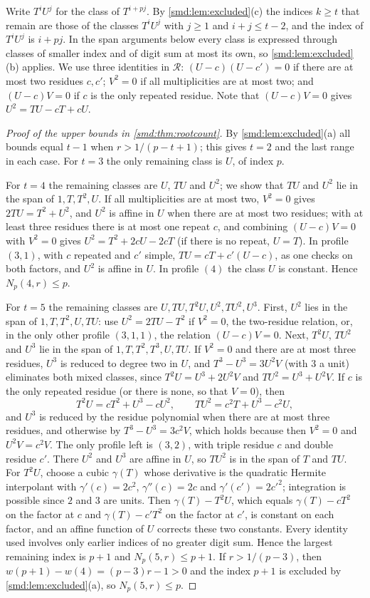 Write $T^iU^j$ for the class of $T^{i+pj}$. By \cref{smd:lem:excluded}(c) the indices $k\ge t$
that remain are those of the classes $T^iU^j$ with $j\ge1$ and $i+j\le t-2$, and the index of
$T^iU^j$ is $i+pj$. In the span arguments below every class is expressed through classes of
smaller index and of digit sum at most its own, so \cref{smd:lem:excluded}(b) applies. We use
three identities in $\mathcal R$: $(U-c)(U-c')=0$ if there are at most two residues $c,c'$;
$V^2=0$ if all multiplicities are at most two; and $(U-c)V=0$ if $c$ is the only repeated
residue. Note that $(U-c)V=0$ gives $U^2=TU-cT+cU$.

\begin{proof}[Proof of the upper bounds in \cref{smd:thm:rootcount}]
By \cref{smd:lem:excluded}(a) all bounds equal $t-1$ when $r>1/(p-t+1)$; this gives $t=2$
and the last range in each case. For $t=3$ the only remaining class is $U$, of index $p$.

For $t=4$ the remaining classes are $U$, $TU$ and $U^2$; we show that $TU$ and $U^2$ lie in
the span of $1,T,T^2,U$. If all multiplicities are at most two, $V^2=0$ gives
$2TU=T^2+U^2$, and $U^2$ is affine in $U$ when there are at most two residues; with at least
three residues there is at most one repeat $c$, and combining $(U-c)V=0$ with $V^2=0$ gives
$U^2=T^2+2cU-2cT$ (if there is no repeat, $U=T$). In profile $(3,1)$, with $c$ repeated and
$c'$ simple, $TU=cT+c'(U-c)$, as one checks on both factors, and $U^2$ is affine in $U$. In
profile $(4)$ the class $U$ is constant. Hence $N_p(4,r)\le p$.

For $t=5$ the remaining classes are $U,TU,T^2U,U^2,TU^2,U^3$. First, $U^2$ lies in the span
of $1,T,T^2,U,TU$: use $U^2=2TU-T^2$ if $V^2=0$, the two-residue relation, or, in the only
other profile $(3,1,1)$, the relation $(U-c)V=0$. Next, $T^2U$, $TU^2$ and $U^3$ lie in the
span of $1,T,T^2,T^3,U,TU$. If $V^2=0$ and there are at most three residues, $U^3$ is
reduced to degree two in $U$, and $T^3-U^3=3U^2V$ (with $3$ a unit) eliminates both mixed
classes, since $T^2U=U^3+2U^2V$ and $TU^2=U^3+U^2V$. If $c$ is the only repeated residue (or
there is none, so that $V=0$), then
\[
 T^2U=cT^2+U^3-cU^2,\qquad TU^2=c^2T+U^3-c^2U,
\]
and $U^3$ is reduced by the residue polynomial when there are at most three residues, and
otherwise by $T^3-U^3=3c^2V$, which holds because then $V^2=0$ and $U^2V=c^2V$. The only
profile left is $(3,2)$, with triple residue $c$ and double residue $c'$. There $U^2$ and
$U^3$ are affine in $U$, so $TU^2$ is in the span of $T$ and $TU$. For $T^2U$, choose a
cubic $\gamma(T)$ whose derivative is the quadratic Hermite interpolant with
$\gamma'(c)=2c^2$, $\gamma''(c)=2c$ and $\gamma'(c')=2c'^2$; integration is possible since
$2$ and $3$ are units. Then $\gamma(T)-T^2U$, which equals $\gamma(T)-cT^2$ on the factor at
$c$ and $\gamma(T)-c'T^2$ on the factor at $c'$, is constant on each factor, and an affine
function of $U$ corrects these two constants. Every identity used involves only earlier
indices of no greater digit sum. Hence the largest remaining index is $p+1$ and
$N_p(5,r)\le p+1$. If $r>1/(p-3)$, then $w(p+1)-w(4)=(p-3)r-1>0$ and the index $p+1$ is
excluded by \cref{smd:lem:excluded}(a), so $N_p(5,r)\le p$.
\end{proof}

